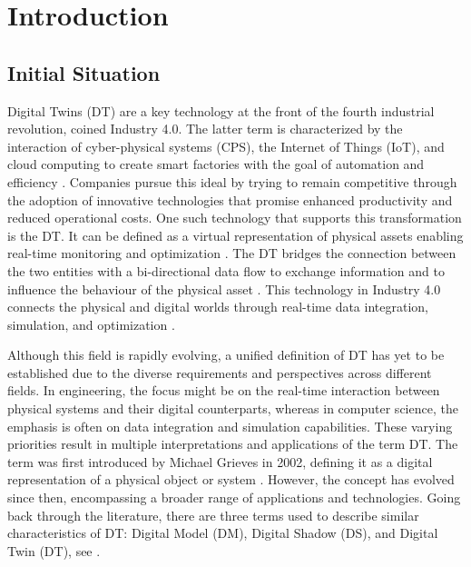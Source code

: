\chapter{Introduction}
\label{chap:introduction}

\section{Initial Situation}
Digital Twins (DT) are a key technology at the front of the fourth industrial revolution, coined Industry 4.0.
The latter term is characterized by the interaction of cyber-physical systems (CPS), the Internet of Things (IoT), and cloud computing to create smart factories with the goal of automation and efficiency \parencite{Oztemel2020}. Companies pursue this ideal by trying to remain competitive through the adoption of innovative technologies that promise enhanced productivity and reduced operational costs. One such technology that supports this transformation is the DT. It can be defined as a virtual representation of physical assets enabling real-time monitoring and optimization \parencite{Tao2018ijamt}. The DT bridges the connection between the two entities with a bi-directional data flow to exchange information and to influence the behaviour of the physical asset \parencite{grieves2014digital}. This technology in Industry 4.0 connects the physical and digital worlds through real-time data integration, simulation, and optimization \parencite{judijanto2024trends}.

Although this field is rapidly evolving, a unified definition of DT has yet to be established due to the diverse requirements and perspectives across different fields. In engineering, the focus might be on the real-time interaction between physical systems and their digital counterparts, whereas in computer science, the emphasis is often on data integration and simulation capabilities. These varying priorities result in multiple interpretations and applications of the term DT. The term was first introduced by Michael Grieves in 2002, defining it as a digital representation of a physical object or system \parencite{grieves2014digital}. However, the concept has evolved since then, encompassing a broader range of applications and technologies. Going back through the literature, there are three terms used to describe similar characteristics of DT: Digital Model (DM), Digital Shadow (DS), and Digital Twin (DT), see  \parencite{jones2020characterising,Zhang2021jmsy}.

